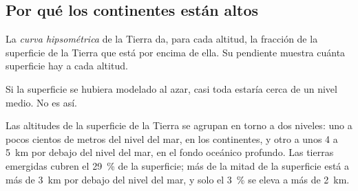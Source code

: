 \subsection{Por qué los continentes están altos}

\begin{definition}\label{def:g11:lithosphere-asthenosphere:hypsometry}
La \emph{curva hipsométrica} de
la Tierra da, para cada altitud, la fracción de la superficie de la Tierra
que está por encima de ella. Su pendiente muestra cuánta superficie hay a cada
altitud.
\end{definition}

Si la superficie se hubiera modelado al azar, casi toda estaría cerca de un
nivel medio. No es así.

\begin{proposition}\label{prop:g11:lithosphere-asthenosphere:two-levels}
Las altitudes de la superficie de la Tierra se agrupan en torno a dos niveles:
uno a pocos cientos de metros del nivel del mar, en los continentes, y otro a
unos 4 a \qty{5}{km} por debajo del nivel del mar, en el fondo oceánico
profundo. Las tierras emergidas cubren el \qty{29}{\percent}
de la superficie; más de la mitad de la superficie está a más de \qty{3}{km}
por debajo del nivel del mar, y solo el \qty{3}{\percent} se eleva a más de
\qty{2}{km}.
\end{proposition}


